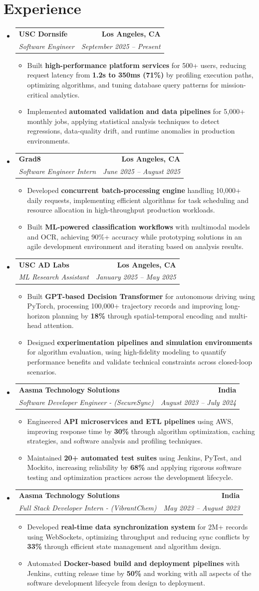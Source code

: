 \documentclass[letterpaper,10pt]{article}
\makeatletter
\newcommand{\resumeItem}[1]{\item\small{{#1 \vspace{-2pt}}}}
\newcommand{\resumeSubheading}[4]{\vspace{-1pt}\item\begin{tabular*}{1.0\textwidth}[t]{l@{\extracolsep{\fill}}r}\textbf{#1} & \textbf{\small #2} \\\textit{\small#3} & \textit{\small #4} \\\end{tabular*}\vspace{-2pt}}
\newcommand{\resumeSubHeadingListStart}{\begin{itemize}[leftmargin=0.0in, label={}]}
\newcommand{\resumeSubHeadingListEnd}{\end{itemize}}
\newcommand{\resumeItemListStart}{\begin{itemize}[leftmargin=0.15in,label=\textbullet,itemsep=2pt,topsep=0pt,parsep=0pt,partopsep=0pt]}
\newcommand{\resumeItemListEnd}{\end{itemize}\vspace{-4pt}}
\makeatother
\begin{document}
\section{Experience}
\resumeSubHeadingListStart
\resumeSubheading{USC Dornsife}{Los Angeles, CA}{Software Engineer}{September 2025 -- Present}
\resumeItemListStart
\resumeItem{Built \textbf{high-performance platform services} for 500+ users, reducing request latency from \textbf{1.2s to 350ms (71\%)} by profiling execution paths, optimizing algorithms, and tuning database query patterns for mission-critical analytics.}
\resumeItem{Implemented \textbf{automated validation and data pipelines} for 5,000+ monthly jobs, applying statistical analysis techniques to detect regressions, data-quality drift, and runtime anomalies in production environments.}
\resumeItemListEnd
\resumeSubheading{Grad8}{Los Angeles, CA}{Software Engineer Intern}{June 2025 -- August 2025}
\resumeItemListStart
\resumeItem{Developed \textbf{concurrent batch-processing engine} handling 10,000+ daily requests, implementing efficient algorithms for task scheduling and resource allocation in high-throughput production workloads.}
\resumeItem{Built \textbf{ML-powered classification workflows} with multimodal models and OCR, achieving 90\%+ accuracy while prototyping solutions in an agile development environment and iterating based on analysis results.}
\resumeItemListEnd
\resumeSubheading{USC AD Labs}{Los Angeles, CA}{ML Research Assistant}{January 2025 -- May 2025}
\resumeItemListStart
\resumeItem{Built \textbf{GPT-based Decision Transformer} for autonomous driving using PyTorch, processing 100,000+ trajectory records and improving long-horizon planning by \textbf{18\%} through spatial-temporal encoding and multi-head attention.}
\resumeItem{Designed \textbf{experimentation pipelines and simulation environments} for algorithm evaluation, using high-fidelity modeling to quantify performance benefits and validate technical constraints across closed-loop scenarios.}
\resumeItemListEnd
\resumeSubheading{Aasma Technology Solutions}{India}{Software Developer Engineer - (SecureSync)}{August 2023 -- July 2024}
\resumeItemListStart
\resumeItem{Engineered \textbf{API microservices and ETL pipelines} using AWS, improving response time by \textbf{30\%} through algorithm optimization, caching strategies, and software analysis and profiling techniques.}
\resumeItem{Maintained \textbf{20+ automated test suites} using Jenkins, PyTest, and Mockito, increasing reliability by \textbf{68\%} and applying rigorous software testing and optimization practices across the development lifecycle.}
\resumeItemListEnd
\resumeSubheading{Aasma Technology Solutions}{India}{Full Stack Developer Intern - (VibrantChem)}{May 2023 -- August 2023}
\resumeItemListStart
\resumeItem{Developed \textbf{real-time data synchronization system} for 2M+ records using WebSockets, optimizing throughput and reducing sync conflicts by \textbf{33\%} through efficient state management and algorithm design.}
\resumeItem{Automated \textbf{Docker-based build and deployment pipelines} with Jenkins, cutting release time by \textbf{50\%} and working with all aspects of the software development lifecycle from design to deployment.}
\resumeItemListEnd
\resumeSubHeadingListEnd
\vspace{-14pt}
\end{document}

